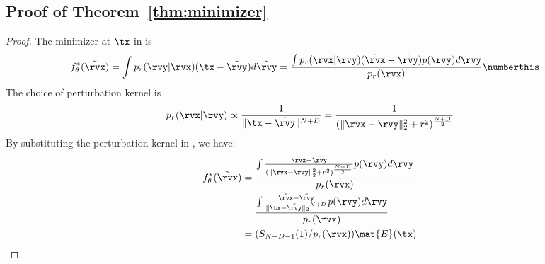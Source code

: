 \subsection{Proof of Theorem~\ref{thm:minimizer}}
\label{app:thm-minimizer}
\thmmin*
\begin{proof}
The minimizer at $\tx$ in  is
\begin{align*}
    f^*_{\theta}(\tilde{\rvx}) &= \int p_r({\rvy}|\rvx) ({{\tx}-\tilde{\rvy}} )d\tilde{\rvy}= \frac{\int p_r(\rvx|{{\rvy}})({\tilde{\rvx}-\tilde{\rvy}})p({\rvy}) d{\rvy}}{p_r(\rvx)}\numberthis \label{eq:minimizer-D}
\end{align*}
The choice of perturbation kernel is
\begin{align*}
    p_r(\rvx|\rvy) \propto \frac{1}{\|\tx - \tilde{\rvy}\|^{N+D}} =  \frac{1}{({\|\rvx-{\rvy}\|_2^2+ r^2})^\frac{N+D}{2}}
\end{align*}
By substituting the perturbation kernel in , we have:
\begin{align*}
    f^*_{\theta}(\tilde{\rvx})  &=\frac{\int \frac{{\tilde{\rvx}-\tilde{\rvy}}}{({\|\rvx-{\rvy}\|_2^2+ r^2})^\frac{N+D}{2}} p({\rvy}) d{\rvy}}{p_r(\rvx)}\\
    &= \frac{\int \frac{{\tilde{\rvx}-\tilde{\rvy}}}{{\|\tx-\tilde{\rvy}\|_2}^{N+D}} p({\rvy}) d{\rvy}}{p_r(\rvx)}\\
    &= ({S_{N+D-1}(1)}/{p_r(\rvx)})\mat{E}(\tx)
\end{align*}
\end{proof}

